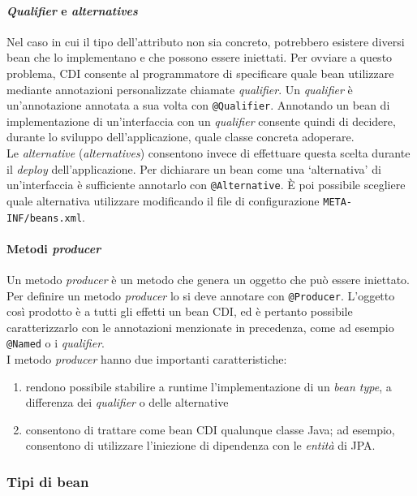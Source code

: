\paragraph{\textit{Qualifier} e \textit{alternatives}} Nel caso in cui il tipo dell'attributo non sia concreto, potrebbero esistere diversi bean che lo implementano e che possono essere iniettati. Per ovviare a questo problema, CDI consente al programmatore di specificare quale bean utilizzare mediante annotazioni personalizzate chiamate \textit{qualifier}. Un \textit{qualifier} è un'annotazione annotata a sua volta con \lstinline{@Qualifier}. Annotando un bean di implementazione di un'interfaccia con un \textit{qualifier} consente quindi di decidere, durante lo sviluppo dell'applicazione, quale classe concreta adoperare.\\
Le \textsl{alternative} (\textit{alternatives}) consentono invece di effettuare questa scelta durante il \textit{deploy} dell'applicazione. Per dichiarare un bean come una \textquoteleft alternativa\textquoteright{} di un'interfaccia è sufficiente annotarlo con \lstinline{@Alternative}. È poi possibile scegliere quale alternativa utilizzare modificando il file di configurazione \texttt{META-INF/beans.xml}.

\paragraph{Metodi \textit{producer}} Un metodo \textit{producer} è un metodo che genera un oggetto che può essere iniettato. Per definire un metodo \textit{producer} lo si deve annotare con \lstinline{@Producer}. L'oggetto così prodotto è a tutti gli effetti un bean CDI, ed è pertanto possibile caratterizzarlo con le annotazioni menzionate in precedenza, come ad esempio \lstinline{@Named} o i \textit{qualifier}.\\
I metodo \textit{producer} hanno due importanti caratteristiche:
\begin{enumerate}
\item rendono possibile stabilire a runtime l'implementazione di un \textit{bean type}, a differenza dei \textit{qualifier} o delle alternative
\item consentono di trattare come bean CDI qualunque classe Java; ad esempio, consentono di utilizzare l'iniezione di dipendenza con le \textsl{entità} di JPA.
\end{enumerate}


\subsubsection{Tipi di bean}

